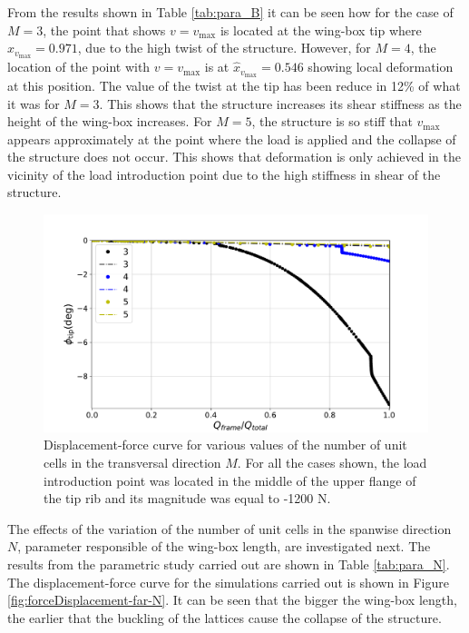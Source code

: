     From the results shown in Table \ref{tab:para_B} it can be seen how for the case of $M = 3$, the point that shows $v = v_{\mathrm{max}}$ is located at the wing-box tip where $\hat{x}_{v_{\mathrm{max}}} = 0.971$, due to the high twist of the structure. However, for $M = 4$, the location of the point with $v = v_{\mathrm{max}}$ is at $\hat{x}_{v_{\mathrm{max}}} = 0.546$ showing local deformation at this position. The value of the twist at the tip \phinonlin has been reduce in 12\% of what it was for $M = 3$. This shows that the structure increases its shear stiffness as the height of the wing-box increases. For $M = 5$, the structure is so stiff that $v_{\mathrm{max}}$ appears approximately at the point where the load is applied and the collapse of the structure does not occur. This shows that deformation is only achieved in the vicinity of the load introduction point due to the high stiffness in shear of the structure.

    \begin{figure}[!htpb] %
      \centering
      \includegraphics[width=0.8 \textwidth]{../figures/result-sim/M/force_displacement-far-1200N}
      \caption[Displacement-force curve for various values of the number of unit cells in the transversal direction]{Displacement-force curve for various values of the number of unit cells in the transversal direction $M$. For all the cases shown, the load introduction point was located in the middle of the upper flange of the tip rib and its magnitude was equal to -1200 N.}\label{fig:forceDisplacement-far-M}
    \end{figure}

    \clearpage
    The effects of the variation of the number of unit cells in the spanwise direction $N$, parameter responsible of the wing-box length, are investigated next. The results from the parametric study carried out are shown in Table \ref{tab:para_N}. The displacement-force curve for the simulations carried out is shown in Figure \ref{fig:forceDisplacement-far-N}. It can be seen that the bigger the wing-box length, the earlier that the buckling of the lattices cause the collapse of the structure.

